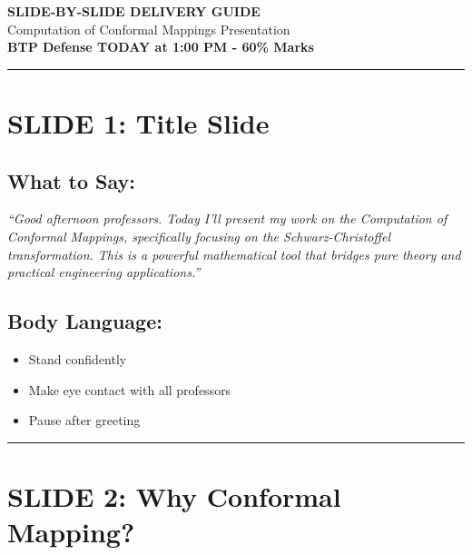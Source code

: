 \documentclass[12pt,a4paper]{article}
\begin{document}
\begin{center}
{\Huge \textbf{SLIDE-BY-SLIDE DELIVERY GUIDE}}\\[10pt]
{\Large Computation of Conformal Mappings Presentation}\\[8pt]
{\large \textbf{BTP Defense TODAY at 1:00 PM - 60\% Marks}}
\end{center}

\vspace{10pt}
\hrule
\vspace{20pt}

\section*{SLIDE 1: Title Slide}

\subsection*{What to Say:}
\begin{quotebox}
\large\textit{``Good afternoon professors. Today I'll present my work on the Computation of Conformal Mappings, specifically focusing on the Schwarz-Christoffel transformation. This is a powerful mathematical tool that bridges pure theory and practical engineering applications.''}
\end{quotebox}

\subsection*{Body Language:}
\begin{itemize}[leftmargin=*]
    \item Stand confidently
    \item Make eye contact with all professors
    \item Pause after greeting
\end{itemize}

\vspace{10pt}
\hrule
\vspace{10pt}

\section*{SLIDE 2: Why Conformal Mapping?}
\end{document}
